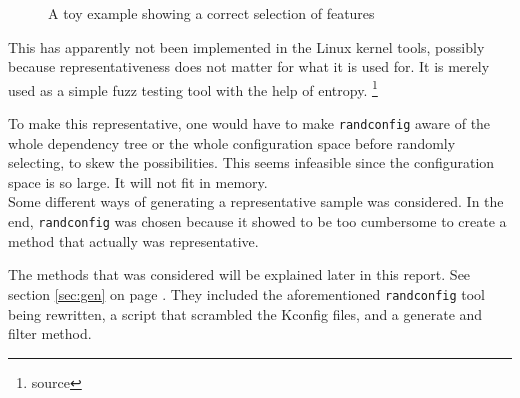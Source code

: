 \documentclass[a4paper,11pt]{report}
\newcommand{\textcode}[1]{
    \fboxsep=1pt
    \texttt{\colorbox{gray!20}{#1}}
}
\newcommand{\figa}{
    \begin{figure}[!htpb]
    \centering
}
\newcommand{\figb}[2]{
    \caption{#1}
    \label{#2}
    \end{figure}
}
\begin{document}
\figa
\figb{A toy example showing a correct selection of features}{randconfigtoy33}

This has apparently not been implemented in the Linux kernel tools, possibly 
because representativeness does not matter for what it is used for. It is 
merely used as a simple fuzz testing tool with the help of entropy.
    \footnote{source}

To make this representative, one would have to make \texttt{randconfig} aware of
the whole dependency tree or the whole configuration space before randomly 
selecting, to skew the possibilities. This seems infeasible since the 
configuration space is so large. It will not fit in memory.
\\

Some different ways of generating a representative sample was considered. In 
the end, \texttt{randconfig} was chosen because it showed to be too cumbersome 
to create a method that actually was representative. 

The methods that was considered will be explained later in this report. 
See section \ref{sec:gen} on page \pageref{sec:gen}.
They included the aforementioned \texttt{randconfig} tool being rewritten, a 
script that scrambled the Kconfig files, and a generate and filter method.
\\
\end{document}

